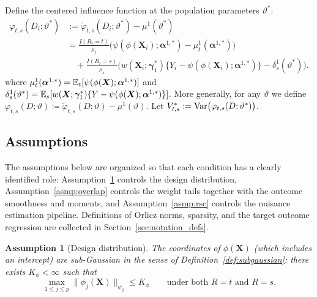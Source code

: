 \documentclass{article}
\newtheorem{assumption}{Assumption}[section]
\begin{document}
Define the centered influence function at the population parameters $\vartheta^*$:
\begin{align*}
\varphi_{t,s}(D_i; \vartheta^*)
&:= \widetilde{\varphi}_{t,s}(D_i; \vartheta^*) - \mu^1(\vartheta^*) \\
&= \frac{I(R_i=t)}{\rho_t}\Big(\psi(\phi(\boldsymbol{X}_i); \boldsymbol{\alpha}^{1,*}) - \mu^1_t(\boldsymbol{\alpha}^{1,*})\Big) \\
&\quad+ \frac{I(R_i=s)}{\rho_s}\Big(
    w(\boldsymbol{X}_i;\boldsymbol{\gamma}_1^*)
    \{Y_i - \psi(\phi(\boldsymbol{X}_i); \boldsymbol{\alpha}^{1,*})\}
    - \delta^1_s(\vartheta^*)
\Big).
\end{align*}
where $\mu^1_t(\boldsymbol{\alpha}^{1,*}) = \operatorname{\mathbb{E}}_t[\psi(\phi(\boldsymbol{X}); \boldsymbol{\alpha}^{1,*})]$ and $\delta^1_s(\vartheta^*) = \operatorname{\mathbb{E}}_s[w(\boldsymbol{X};\boldsymbol{\gamma}_1^*) \{Y - \psi(\phi(\boldsymbol{X}); \boldsymbol{\alpha}^{1,*})\}]$.
More generally, for any $\vartheta$ we define $\varphi_{t,s}(D;\vartheta) \coloneqq \widetilde{\varphi}_{t,s}(D;\vartheta) - \mu^1(\vartheta)$.
Let $V^*_{t,s} := \operatorname{Var}\!\big(\varphi_{t,s}(D; \vartheta^*)\big)$.

\subsection{Assumptions}

The assumptions below are organized so that each condition has a clearly identified role: Assumption~\ref{asmp:data} controls the design distribution, Assumption~\ref{asmp:overlap} controls the weight tails together with the outcome smoothness and moments, and Assumption~\ref{asmp:rsc} controls the nuisance estimation pipeline. Definitions of Orlicz norms, sparsity, and the target outcome regression are collected in Section~\ref{sec:notation_defs}.

\begin{assumption}[Design distribution]\label{asmp:data}
The coordinates of $\phi(\boldsymbol{X})$ (which includes an intercept) are sub-Gaussian in the sense of Definition~\ref{def:subgaussian}: there exists $K_\phi<\infty$ such that
\[
\max_{1\le j\le p}\|\phi_j(\boldsymbol{X})\|_{\psi_2}\le K_\phi\qquad\text{under both }R=t\text{ and }R=s.
\]
\end{assumption}
\end{document}
